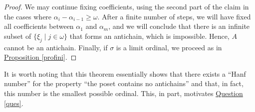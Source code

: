 \documentclass[reqno]{amsart}
\theoremstyle{definition}
\theoremstyle{definition}
\theoremstyle{plain} %
\begin{document}
\begin{proof}
    We may continue fixing coefficients, using the second part of the claim in the cases where $\alpha_i - \alpha_{i-1} \geq \omega$. After a finite number of steps, we will have fixed all coefficients between $\alpha_1$ and $\alpha_m$, and we will conclude that there is an infinite subset of $\{\xi_j \mid j \in \omega\}$ that forms an antichain, which is impossible. Hence, $A$ cannot be an antichain. Finally, if $\sigma$ is a limit ordinal, we proceed as in \hyperref[profini]{Proposition \ref{profini}}.
\end{proof}
It is worth noting that this theorem essentially shows that there exists a ``Hanf number'' for the property ``the poset contains no antichains'' and that, in fact, this number is the smallest
possible ordinal. This, in part, motivates \hyperref[ques]{Question \ref{ques}}.
\end{document}
